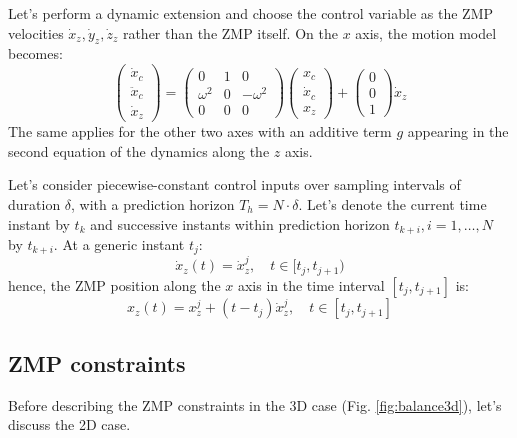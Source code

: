 Let's perform a dynamic extension and choose the control variable as the ZMP 
velocities $\dot{x}_z, \dot{y}_z, \dot{z}_z$ rather than the ZMP itself. On the 
$x$ axis, the motion model becomes:
\begin{equation}
  \label{eq:vhcomlip-motion-model}
  \begin{pmatrix}
    \dot{x}_c \\
    \ddot{x}_c \\
    \dot{x}_z
  \end{pmatrix}
  =
  \begin{pmatrix}
    0 & 1 & 0 \\
    \omega^2 & 0 & -\omega^2 \\
    0 & 0 & 0
  \end{pmatrix}
  \begin{pmatrix}
    x_c \\
    \dot{x}_c \\
    x_z
  \end{pmatrix}
  +
  \begin{pmatrix}
    0 \\
    0 \\
    1
  \end{pmatrix}
  \dot{x}_z
\end{equation}
The same applies for the other two axes with an additive term $g$ appearing 
in the second equation of the dynamics along the $z$ axis.

Let's consider piecewise-constant control inputs over sampling intervals of
duration $\delta$, with a prediction horizon $T_h = N \cdot \delta$.
Let's denote the current time instant by $t_k$ and successive instants within
prediction horizon $t_{k+i}, i = 1, \dots, N$ by $t_{k+i}$.
At a generic instant $t_j$:
\begin{equation}
  \dot{x}_z(t) = \dot{x}_z^j, \quad t \in [t_j, t_{j+1})
\end{equation}
hence, the ZMP position along the $x$ axis in the time interval
$[t_j, t_{j+1}]$ is:
\begin{equation}
  x_z(t) = x_z^j + (t - t_j) \dot{x}_z^j, \quad t \in [t_j, t_{j+1}]
\end{equation}

\subsection{ZMP constraints}
Before describing the ZMP constraints in the 3D case (Fig. \ref{fig:balance3d}),
let's discuss the 2D case.

